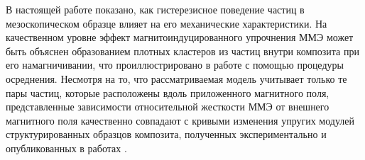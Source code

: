 В настоящей работе показано, как гистерезисное поведение частиц в мезоскопическом образце влияет на его механические характеристики. На качественном уровне эффект магнитоиндуцированного упрочнения ММЭ может быть объяснен образованием плотных кластеров из частиц внутри композита при его намагничивании, что проиллюстрировано в работе с помощью процедуры осреднения. Несмотря на то, что рассматриваемая модель учитывает только те пары частиц, которые расположены вдоль приложенного магнитного поля, представленные зависимости относительной жесткости ММЭ от внешнего магнитного поля качественно совпадают с кривыми изменения упругих модулей структурированных образцов композита, полученных экспериментально и опубликованных в работах \cite{Stepanov_07,Abramchuk_06}. 





















\RusRef



